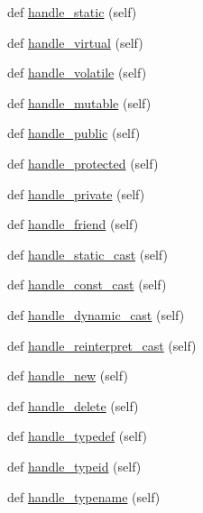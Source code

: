 \begin{DoxyCompactItemize}
\item 
def \hyperlink{classcpp_1_1ast_1_1_ast_builder_ad98bc262537d2882adc2017023cef6aa}{handle\+\_\+static} (self)
\item 
def \hyperlink{classcpp_1_1ast_1_1_ast_builder_a44710dc0b8e5bdbecaa56f7c4b59c046}{handle\+\_\+virtual} (self)
\item 
def \hyperlink{classcpp_1_1ast_1_1_ast_builder_a2dfb23ddeb05e1017b3d1ce85a40cacb}{handle\+\_\+volatile} (self)
\item 
def \hyperlink{classcpp_1_1ast_1_1_ast_builder_a6a642353cfe2cddd1a60cbb1011df787}{handle\+\_\+mutable} (self)
\item 
def \hyperlink{classcpp_1_1ast_1_1_ast_builder_a1e69925578e0ee0a2b7aeb219eda449b}{handle\+\_\+public} (self)
\item 
def \hyperlink{classcpp_1_1ast_1_1_ast_builder_aa4ff62142927f8f245a2030b444676ee}{handle\+\_\+protected} (self)
\item 
def \hyperlink{classcpp_1_1ast_1_1_ast_builder_a8bc5f9563f5ead3abba5a71187162867}{handle\+\_\+private} (self)
\item 
def \hyperlink{classcpp_1_1ast_1_1_ast_builder_ab9f7d81019317c6ccfd492bd2c0c9579}{handle\+\_\+friend} (self)
\item 
def \hyperlink{classcpp_1_1ast_1_1_ast_builder_ab7577b3a2bd22c1bccb656493de379f3}{handle\+\_\+static\+\_\+cast} (self)
\item 
def \hyperlink{classcpp_1_1ast_1_1_ast_builder_a4dae74f1d036f63fc1080962ab0208fc}{handle\+\_\+const\+\_\+cast} (self)
\item 
def \hyperlink{classcpp_1_1ast_1_1_ast_builder_a659b5ad02ffebe26c1496a319128fbd1}{handle\+\_\+dynamic\+\_\+cast} (self)
\item 
def \hyperlink{classcpp_1_1ast_1_1_ast_builder_a06d75904ba7487c7966d073aaa3d74e9}{handle\+\_\+reinterpret\+\_\+cast} (self)
\item 
def \hyperlink{classcpp_1_1ast_1_1_ast_builder_a86f5769e0460524691ae0d135d30f101}{handle\+\_\+new} (self)
\item 
def \hyperlink{classcpp_1_1ast_1_1_ast_builder_aa5b7a781afe524bebdf42bdeb4766507}{handle\+\_\+delete} (self)
\item 
def \hyperlink{classcpp_1_1ast_1_1_ast_builder_a808eb3d955ca2e3a957abb35dc577c66}{handle\+\_\+typedef} (self)
\item 
def \hyperlink{classcpp_1_1ast_1_1_ast_builder_ac30cfc1a3a455310a9ccac885d2d0d7c}{handle\+\_\+typeid} (self)
\item 
def \hyperlink{classcpp_1_1ast_1_1_ast_builder_a4b7b3bb4f47f67052b04e5da173d1c6b}{handle\+\_\+typename} (self)

\end{DoxyCompactItemize}
